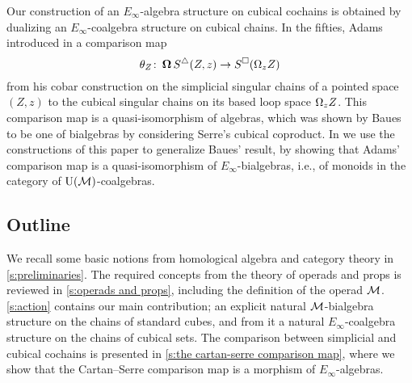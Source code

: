Our construction of an $E_\infty$-algebra structure on cubical cochains is obtained by dualizing an $E_\infty$-coalgebra structure on cubical chains.
In the fifties, Adams introduced in \cite{adams1956cobar} a comparison map
\[
\theta_Z \colon \operatorname{\mathbf{\Omega}} S^\triangle(Z,z) \to S^\square(\Omega_z Z)
\]
from his cobar construction on the simplicial singular chains of a pointed space $(Z,z)$ to the cubical singular chains on its based loop space $\Omega_z Z$.
This comparison map is a quasi-isomorphism of algebras, which was shown by Baues \cite{baues1998hopf} to be one of bialgebras by considering Serre's cubical coproduct.
In \cite{medina2021cobar} we use the constructions of this paper to generalize Baues' result, by showing that Adams' comparison map is a quasi-isomorphism of $E_\infty$-bialgebras, i.e., of monoids in the category of ${\operatorname{U}(\mathcal{M})}$-coalgebras.

\subsection*{Outline}

We recall some basic notions from homological algebra and category theory in \cref{s:preliminaries}.
The required concepts from the theory of operads and props is reviewed in \cref{s:operads and props}, including the definition of the operad $\mathcal{M}$.
\cref{s:action} contains our main contribution; an explicit natural $\mathcal{M}$-bialgebra structure on the chains of standard cubes, and from it a natural $E_\infty$-coalgebra structure on the chains of cubical sets.
The comparison between simplicial and cubical cochains is presented in \cref{s:the cartan-serre comparison map}, where we show that the Cartan--Serre comparison map is a morphism of $E_\infty$-algebras.